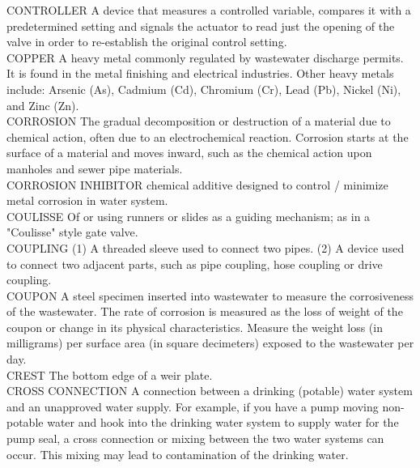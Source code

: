 \documentclass{article}
\begin{document}
CONTROLLER
A device that measures a controlled variable, compares it with a predetermined setting and signals the actuator to read just the opening of the valve in order to re-establish the original control setting.
\vspace{0.3cm}\\
COPPER
A heavy metal commonly regulated by wastewater discharge permits. It is found in the metal finishing and electrical industries. Other heavy metals include: Arsenic (As), Cadmium (Cd), Chromium (Cr), Lead (Pb), Nickel (Ni), and Zinc (Zn).
\vspace{0.3cm}\\
CORROSION
The gradual decomposition or destruction of a material due to chemical action, often due to an electrochemical reaction. Corrosion starts at the surface of a material and moves inward, such as the chemical action upon manholes and sewer pipe materials. 
\vspace{0.3cm}\\
CORROSION INHIBITOR
chemical additive designed to control / minimize metal corrosion in water system.
\vspace{0.3cm}\\
COULISSE
Of or using runners or slides as a guiding mechanism; as in a "Coulisse" style gate valve.
\vspace{0.3cm}\\
COUPLING
(1) A threaded sleeve used to connect two pipes. (2) A device used to connect two adjacent parts, such as pipe coupling, hose coupling or drive coupling. 
\vspace{0.3cm}\\
COUPON
A steel specimen inserted into wastewater to measure the corrosiveness of the wastewater. The rate of corrosion is measured as the loss of weight of the coupon or change in its physical characteristics. Measure the weight loss (in milligrams) per surface area (in square decimeters) exposed to the wastewater per day. 
\vspace{0.3cm}\\
CREST
The bottom edge of a weir plate.
\vspace{0.3cm}\\
CROSS CONNECTION
A connection between a drinking (potable) water system and an unapproved water supply. For example, if you have a pump moving non-potable water and hook into the drinking water system to supply water for the pump seal, a cross connection or mixing between the two water systems can occur. This mixing may lead to contamination of the drinking water.
\vspace{0.3cm}\\
\end{document}
